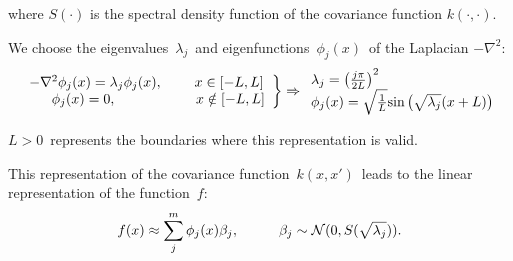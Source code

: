 \documentclass[landscape,a1,final]{a0poster} %
\newtheorem*{remark}{Remark}
\let\tempone\itemize
\let\temptwo\enditemize
\renewenvironment{itemize}{\tempone\addtolength{\itemsep}{-0.3\baselineskip}}{\temptwo}
\begin{document}
\begin{minipage}{1\linewidth}
\begin{minipage}[t]{0.31\textwidth}
\begin{itemize}
\item where $S(\cdot)$ is the {\color{navyblue}spectral density function} of the covariance function $k(\cdot,\cdot)$.


\item We choose the {\color{navyblue} eigenvalues}\, $\lambda_j$\, and {\color{navyblue} eigenfunctions}\, $\phi_j(x)$\, of the Laplacian $-\nabla^2$:
%
\begin{align*}
\left. \begin{array}{cc}
 -\nabla^2 \phi_j(x) = \lambda_j \phi_j(x), \hspace{0.8cm}  x \in [-L,L] \\
\hspace{6mm} \phi_j(x) = 0, \hspace{2cm} x \notin [-L,L] 
\end{array} \right\} \Rightarrow \begin{array}{ll}
 \lambda_j=\left(\frac{j\pi}{2L}\right)^2 \\
\phi_j(x)=\sqrt{\frac{1}{L}} \text{sin}\left(\sqrt{\lambda_j}(x+L)\right) 
\end{array}
\end{align*} 


\item $L > 0$\, represents the {\color{navyblue} boundaries} where this representation is valid.


\item This representation of the covariance function\, $k(x,x')$\, leads to the {\color{navyblue} linear representation} of the function\, $f$:
%
\begin{align*}
f(x) \approx \sum_{j}^m \phi_j(x) \beta_j, \hspace{10mm} \beta_j \sim \mathcal{N}(0,S(\sqrt{\lambda_j})).
\end{align*}
\end{itemize}


\end{minipage}
\end{minipage}
\end{document}
